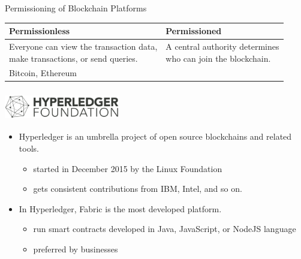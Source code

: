 \documentclass[xcolor=svgnames]{beamer}
\begin{document}
\begin{frame}{Permissioning of Blockchain Platforms}

\begin{table}
\small
\renewcommand*{\arraystretch}{2}
\begin{tabular}{ll}
Permissionless                                                              & Permissioned                                                \\ \hline
\makecell[l]{Everyone can view the transaction data, \\make transactions, or send queries.} & \makecell[l]{A central authority determines \\who can join the blockchain.} \\
Bitcoin, Ethereum                                                           & \onslide<2->{Hyperledger Fabric}                                          \\
\end{tabular}
\end{table}

\end{frame}

\begin{frame}
\frametitle{
\includegraphics[height=1cm]{hyperledgerfoundation_horizontal-dark.png}
\qquad
{}
}

\begin{itemize}
\item Hyperledger is an umbrella project of open source blockchains and related tools.
\begin{itemize}
\item started in December 2015 by the Linux Foundation
\item gets consistent contributions from IBM, Intel, and so on.
\end{itemize}

\item<2-> In Hyperledger, Fabric is the most developed platform.
\begin{itemize}
\item run smart contracts developed in Java, JavaScript, or NodeJS language
\item preferred by businesses
\end{itemize}
\end{itemize}
\end{frame}
\end{document}
